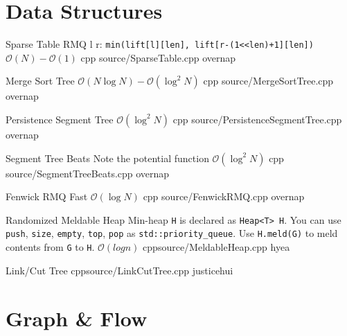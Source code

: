 \documentclass[landscape, 10pt, a4paper, oneside, twocolumn]{extarticle}
\begin{document}
\maketitlepage



\section{Data Structures}


\Algorithm
{Sparse Table}
{RMQ l r: \texttt{min(lift[l][len], lift[r-(1<<len)+1][len])}}
{$\mathcal{O}(N)-\mathcal{O}(1)$}
{cpp}
{source/SparseTable.cpp}
{overnap}

\Algorithm
{Merge Sort Tree}
{}
{$\mathcal{O}(N\log{N})-\mathcal{O}(\log^2{N})$}
{cpp}
{source/MergeSortTree.cpp}
{overnap}


\Algorithm
{Persistence Segment Tree}
{}
{$\mathcal{O}(\log^2{N})$}
{cpp}
{source/PersistenceSegmentTree.cpp}
{overnap}

\Algorithm
{Segment Tree Beats}
{Note the potential function}
{$\mathcal{O}(\log^2{N})$}
{cpp}
{source/SegmentTreeBeats.cpp}
{overnap}

\Algorithm
{Fenwick RMQ}
{}
{Fast $\mathcal{O}(\log{N})$}
{cpp}
{source/FenwickRMQ.cpp}
{overnap}


\Algorithm
{Randomized Meldable Heap}
{Min-heap \texttt{H} is declared as \texttt{Heap<T> H}. You can use \texttt{push}, \texttt{size}, \texttt{empty}, \texttt{top}, \texttt{pop} as \texttt{std::priority\_queue}. Use \texttt{H.meld(G)} to meld contents from \texttt{G} to \texttt{H}. }
{$\mathcal{O}(log n)$}
{cpp}{source/MeldableHeap.cpp}
{hyea}


\Algorithm
{Link/Cut Tree}
{}
{}
{cpp}{source/LinkCutTree.cpp}
{justicehui}


\section{Graph \& Flow}
\end{document}
